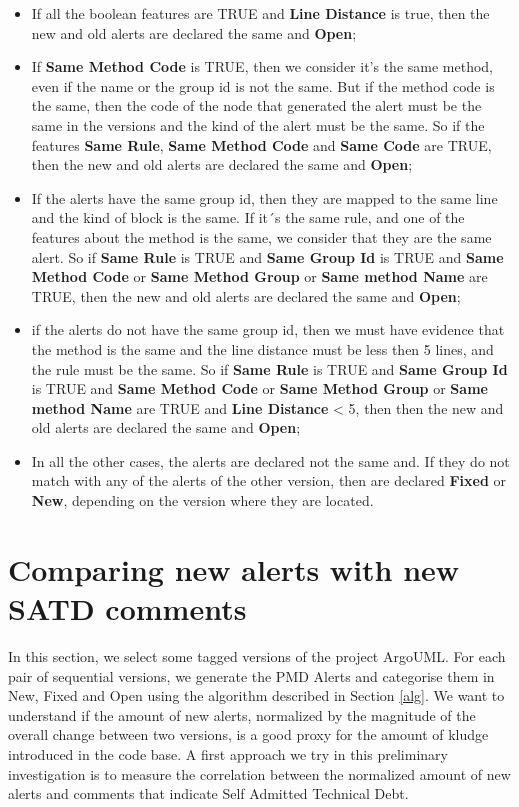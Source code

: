 \documentclass[
]{article}
\begin{document}
\begin{itemize}
\item If all the boolean features are TRUE and \textbf{Line Distance} is true, then the new and old alerts are declared the same and \textbf{Open};
\item If \textbf{Same Method Code} is TRUE, then we consider it's the same method, even if the name or the group id is not the same. But if the method code is the same, then the code of the node that generated the alert must be the same in the versions and the kind of the alert must be the same. So if the features \textbf{Same Rule}, \textbf{Same Method Code} and 
\textbf{Same Code} are TRUE, then the new and old alerts are declared the same and \textbf{Open};
\item If the alerts have the same group id, then they are mapped to the same line and the kind of block is the same. If it´s the same rule, and one of the features about the method is the same, we consider that they are the same alert. So if \textbf{Same Rule} is TRUE and \textbf{Same Group Id} is TRUE and \textbf{Same Method Code} or \textbf{Same Method Group} or \textbf{Same method Name} are TRUE, then the new and old alerts are declared the same and \textbf{Open};
\item if the alerts do not have the same group id, then we must have evidence that the method is the same and the line distance must be less then 5 lines, and the rule must be the same. So if \textbf{Same Rule} is TRUE and \textbf{Same Group Id} is TRUE and \textbf{Same Method Code} or \textbf{Same Method Group} or \textbf{Same method Name} are TRUE and \textbf{Line Distance} < 5, then then the new and old alerts are declared the same and \textbf{Open};
\item In all the other cases, the alerts are declared not the same and. If they do not match with any of the alerts of the other version, then are declared \textbf{Fixed} or \textbf{New}, depending on the version where they are located.
        
\end{itemize}

\section{Comparing new alerts with new SATD comments}\label{results}

In this section, we select some tagged versions of the project ArgoUML.
For each pair of sequential versions, we generate the PMD Alerts and
categorise them in New, Fixed and Open using the algorithm described in
Section \ref{alg}. We want to understand if the amount of new alerts,
normalized by the magnitude of the overall change between two versions,
is a good proxy for the amount of kludge introduced in the code base. A
first approach we try in this preliminary investigation is to measure
the correlation between the normalized amount of new alerts and comments
that indicate Self Admitted Technical Debt.
\end{document}
